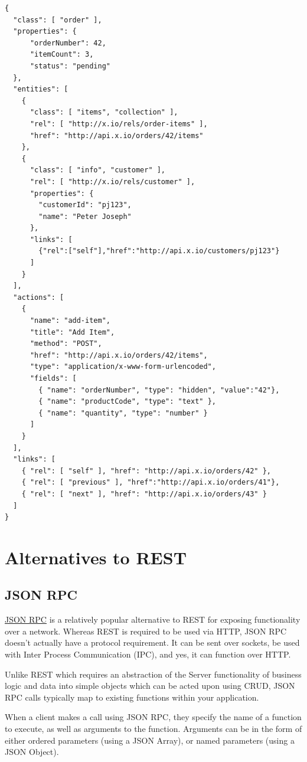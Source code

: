 \documentclass{book}
\begin{document}
\begin{verbatim}
{
  "class": [ "order" ],
  "properties": { 
      "orderNumber": 42, 
      "itemCount": 3,
      "status": "pending"
  },
  "entities": [
    { 
      "class": [ "items", "collection" ], 
      "rel": [ "http://x.io/rels/order-items" ], 
      "href": "http://api.x.io/orders/42/items"
    },
    {
      "class": [ "info", "customer" ],
      "rel": [ "http://x.io/rels/customer" ], 
      "properties": { 
        "customerId": "pj123",
        "name": "Peter Joseph"
      },
      "links": [
        {"rel":["self"],"href":"http://api.x.io/customers/pj123"}
      ]
    }
  ],
  "actions": [
    {
      "name": "add-item",
      "title": "Add Item",
      "method": "POST",
      "href": "http://api.x.io/orders/42/items",
      "type": "application/x-www-form-urlencoded",
      "fields": [
        { "name": "orderNumber", "type": "hidden", "value":"42"},
        { "name": "productCode", "type": "text" },
        { "name": "quantity", "type": "number" }
      ]
    }
  ],
  "links": [
    { "rel": [ "self" ], "href": "http://api.x.io/orders/42" },
    { "rel": [ "previous" ], "href":"http://api.x.io/orders/41"},
    { "rel": [ "next" ], "href": "http://api.x.io/orders/43" }
  ]
}
\end{verbatim}


\section{Alternatives to REST}

\subsection{JSON RPC}

\href{http://www.jsonrpc.org/specification}{JSON RPC} is a relatively popular alternative to REST for exposing functionality over a network. Whereas REST is required to be used via HTTP, JSON RPC doesn't actually have a protocol requirement. It can be sent over sockets, be used with Inter Process Communication (IPC), and yes, it can function over HTTP.

Unlike REST which requires an abstraction of the Server functionality of business logic and data into simple objects which can be acted upon using CRUD, JSON RPC calls typically map to existing functions within your application.

When a client makes a call using JSON RPC, they specify the name of a function to execute, as well as arguments to the function. Arguments can be in the form of either ordered parameters (using a JSON Array), or named parameters (using a JSON Object).
\end{document}

